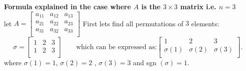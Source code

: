 \documentclass{report}
\begin{document}
              \textbf{Formula explained in the case where $A$ is the $3\times  3$ matrix i.e.  $n=3$}\\
              let $A = \begin{bmatrix}
              a_{11} & a_{12} & a_{13}\\
              a_{21} & a_{22} & a_{23}\\
              a_{31} & a_{32} & a_{33}\\
              \end{bmatrix}$ First lets find all permutations of $3$ elements:
              \[
              \sigma = \begin{bmatrix}
              1 & 2 & 3\\
              1 & 2 & 3\\
              \end{bmatrix} \qquad \text{which can be expressed as:} \begin{bmatrix}
              1 & 2 & 3\\
              \sigma\left( 1 \right)  & \sigma\left( 2 \right)  & \sigma\left( 3 \right) \\
              \end{bmatrix}
              .\] 
              where $\sigma\left( 1 \right) =1$, $\sigma\left( 2 \right) =2$ , $ \sigma\left( 3 \right) =3$ and sgn $\left(  \sigma\right) =1$.\\
\end{document}
